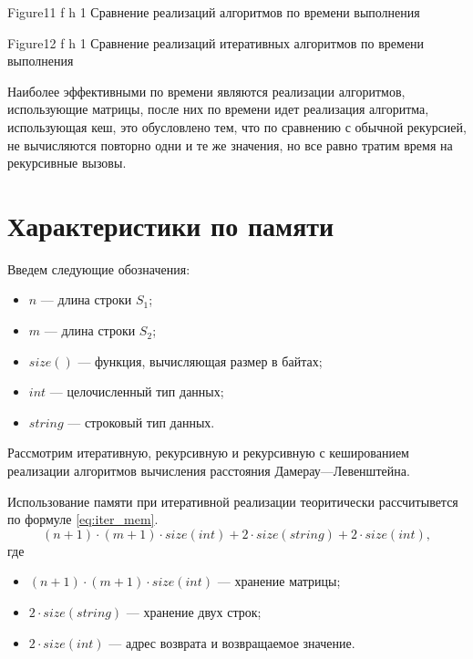 {Figure11} %
{f} %
{h} %
{1\textwidth} %
{Сравнение реализаций алгоритмов по времени выполнения} %

{Figure12} %
{f} %
{h} %
{1\textwidth} %
{Сравнение реализаций итеративных алгоритмов по времени выполнения} %

\clearpage

Наиболее эффективными по времени являются реализации алгоритмов, использующие матрицы, после них по времени идет реализация алгоритма, использующая кеш, это обусловлено тем, что по сравнению с обычной рекурсией, не вычисляются повторно одни и те же значения, но все равно тратим время на рекурсивные вызовы. 

\section{Характеристики по памяти}

\label{memory}

Введем следующие обозначения:
\begin{itemize}
	\item $n$ --- длина строки $S_1$;
	\item $m$ --- длина строки $S_2$;
	\item $size()$ --- функция, вычисляющая размер в байтах;
	\item $int$ --- целочисленный тип данных;
	\item $string$ --- строковый тип данных.
\end{itemize}

Рассмотрим итеративную, рекурсивную и рекурсивную с кешированием реализации алгоритмов вычисления расстояния Дамерау---Левенштейна.


Использование памяти при итеративной реализации теоритически рассчитывется по формуле \eqref{eq:iter_mem}.
\begin{equation}
	\label{eq:iter_mem}
	(n + 1) \cdot (m + 1) \cdot size(int) + 2 \cdot size(string) + 2 \cdot size(int),
\end{equation}
где 
\begin{itemize}
	\item $ (n + 1) \cdot (m + 1) \cdot size(int) $ --- хранение матрицы;
	\item $ 2 \cdot size(string) $ --- хранение двух строк;
	\item $ 2 \cdot size(int) $ --- адрес возврата и возвращаемое значение.
\end{itemize}


